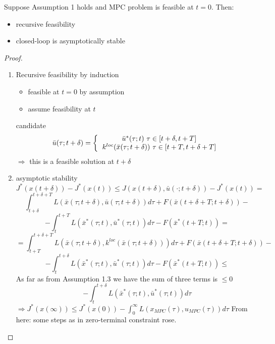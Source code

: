 \begin{Theorem}

Suppose Assumption 1 holds and MPC problem is feasible at $t=0$. Then:
\begin{itemize}
\item recursive feasibility
\item closed-loop is asymptotically stable
\end{itemize}

\begin{proof}
\begin{enumerate}
\item Recursive feasibility by induction 
\begin{itemize}
\item feasible at $t=0$ by assumption
\item assume feasibility at $t$
\end{itemize}
candidate 
\begin{equation*}
\bar u(\tau; t+\delta) =
\left \{
  \begin{tabular}{c}
  $\bar u^*(\tau;t) \ \tau \in [t+\delta, t+ T]$ \\
  $k^{loc}(\bar x(\tau;t+\delta)) \ \tau \in [t+T, t+\delta+T]$ 
  \end{tabular}
  \right.
\end{equation*}
$\Rightarrow$ this is a feasible solution at $t+\delta$
\item asymptotic stability
\begin{equation*}
J^*(x(t+\delta)) - J^*(x(t)) \leq J(x(t+\delta), \bar u(\cdot;t+\delta)) - J^*(x(t)) =
\end{equation*}
\begin{equation*}
\int_{t+\delta}^{t+ \delta +T} L(\bar x(\tau;t+\delta), \bar u(\tau;t+\delta)) d\tau + F(\bar x(t+\delta+ T;t+\delta)) -
\end{equation*}
\begin{equation*}
- \int_{t}^{t+T}L(\bar x^*(\tau;t),\bar u^*(\tau;t))d\tau - F(\bar x^*(t+T;t)) =
\end{equation*}
\begin{equation*}
= \int_{t+T}^{t+\delta+T}L(\bar x(\tau;t+\delta), k^{loc}(\bar x(\tau;t+\delta)))d\tau + F(\bar x(t+\delta+T;t+\delta)) -
\end{equation*}
\begin{equation*}
- \int_t^{t+\delta}L(\bar x^*(\tau;t), \bar u^*(\tau;t))d\tau - F(\bar x^*(t+T;t)) \leq
\end{equation*}
As far as from Assumption 1.3 we have the sum of three terms is $\leq 0$
\begin{equation*}
-\int_t^{t+\delta}L(\bar x^*(\tau;t),\bar u^*(\tau;t))d\tau
\end{equation*}
$\Rightarrow J^*(x(\infty)) \leq J^*(x(0)) - \int_0^{\infty}L(x_{MPC}(\tau), u_{MPC}(\tau))d\tau$
From here: some steps as in zero-terminal constraint rose. 
\end{enumerate}
\end{proof}
\end{Theorem}

